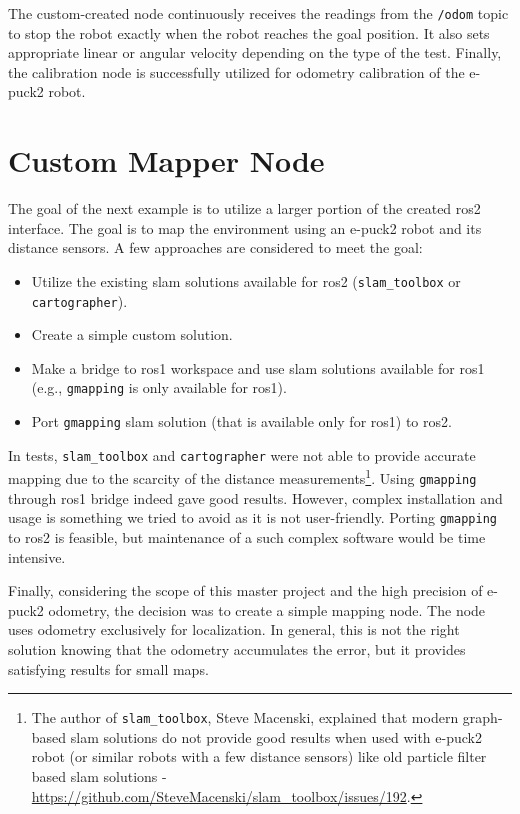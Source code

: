 The custom-created node continuously receives the readings from the \texttt{/odom} topic to stop the robot exactly when the robot reaches the goal position.
It also sets appropriate linear or angular velocity depending on the type of the test.
Finally, the calibration node is successfully utilized for odometry calibration of the e-puck2 robot.

\section{Custom Mapper Node}
\label{sec:demos:mapping}

The goal of the next example is to utilize a larger portion of the created \ac{ros2} interface.
The goal is to map the environment using an e-puck2 robot and its distance sensors.
A few approaches are considered to meet the goal:
\begin{itemize}
    \item Utilize the existing \ac{slam} solutions available for \ac{ros2} (\texttt{slam\_toolbox} or \texttt{cartographer}).
    \item Create a simple custom solution.
    \item Make a bridge to \ac{ros}1 workspace and use \ac{slam} solutions available for \ac{ros}1 (e.g., \texttt{gmapping} is only available for \ac{ros}1).
    \item Port \texttt{gmapping} \ac{slam} solution (that is available only for \ac{ros}1) to \ac{ros2}.
\end{itemize}

In tests, \texttt{slam\_toolbox} and \texttt{cartographer} were not able to provide accurate mapping due to the scarcity of the distance measurements\footnote{The author of \texttt{slam\_toolbox}, Steve Macenski, explained that modern graph-based \ac{slam} solutions do not provide good results when used with e-puck2 robot (or similar robots with a few distance sensors) like old particle filter based \ac{slam} solutions - \url{https://github.com/SteveMacenski/slam_toolbox/issues/192}.}. Using \texttt{gmapping} through \ac{ros}1 bridge indeed gave good results.
However, complex installation and usage is something we tried to avoid as it is not user-friendly.
Porting \texttt{gmapping} to \ac{ros2} is feasible, but maintenance of a such complex software would be time intensive.

Finally, considering the scope of this master project and the high precision of e-puck2 odometry, the decision was to create a simple mapping node.
The node uses odometry exclusively for localization.
In general, this is not the right solution knowing that the odometry accumulates the error, but it provides satisfying results for small maps. 


